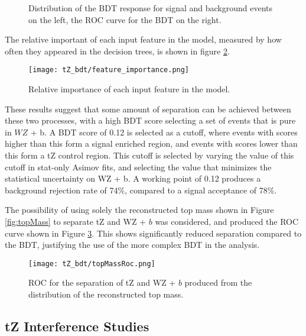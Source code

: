 \begin{figure}[H] 
\center
    \caption{Distribution of the BDT response for signal and background events on the left, the ROC curve for the BDT on the right.}
    \label{fig:tZ_bdt}
\end{figure}

The relative important of each input feature in the model, measured by how often they appeared in the decision trees, is shown in figure \ref{fig:tZ_fImp}.

\begin{figure}[H] 
\center
        \texttt{[image: tZ\_bdt/feature\_importance.png]}
        \caption{Relative importance of each input feature in the model.}
        \label{fig:tZ_fImp}
\end{figure}

These results suggest that some amount of separation can be achieved between these two processes, with a high BDT score selecting a set of events that is pure in $WZ$ + b. A BDT score of 0.12 is selected as a cutoff, where events with scores higher than this form a signal enriched region, and events with scores lower than this form a tZ control region. This cutoff is selected by varying the value of this cutoff in stat-only Asimov fits, and selecting the value that minimizes the statistical uncertainty on WZ + b. A working point of 0.12 produces a background rejection rate of 74\%, compared to a signal acceptance of 78\%.

The possibility of using solely the reconstructed top mass shown in Figure \ref{fig:topMass} to separate tZ and WZ + $b$ was considered, and produced the ROC curve shown in Figure \ref{fig:topRoc}. This shows significantly reduced separation compared to the BDT, justifying the use of the more complex BDT in the analysis.

\begin{figure}[H]
\center
        \texttt{[image: tZ\_bdt/topMassRoc.png]}
        \caption{ROC for the separation of tZ and WZ + $b$ produced from the distribution of the reconstructed top mass.}
        \label{fig:topRoc}
\end{figure}


\subsection{tZ Interference Studies}
\label{sec:tZInt}


